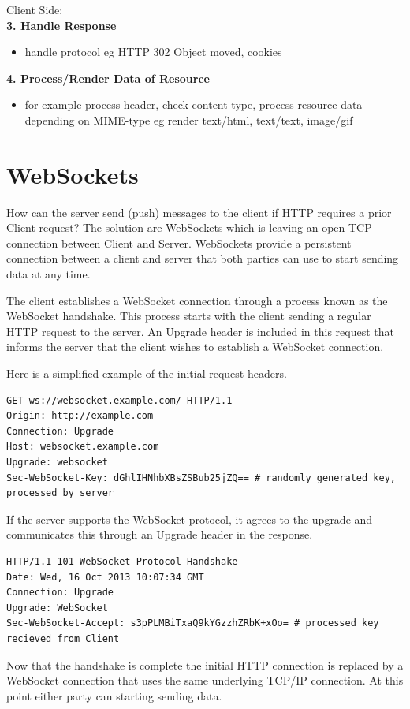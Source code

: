 \documentclass[11pt]{article}
\begin{document}
Client Side:\\
\textbf{3. Handle Response}
\begin{itemize}
\item handle protocol eg HTTP 302 Object moved, cookies
\end{itemize}
\textbf{4. Process/Render Data of Resource}
\begin{itemize}
\item for example process header, check content-type, process resource data depending on MIME-type eg render text/html, text/text, image/gif
\end{itemize}

\section{WebSockets}
\label{sec:orgf5c4e53}
How can the server send (push) messages to the client if HTTP requires a prior Client request? The solution are WebSockets which is leaving an open TCP connection between Client and Server. WebSockets provide a persistent connection between a client and server that both parties can use to start sending data at any time.

The client establishes a WebSocket connection through a process known as the WebSocket handshake. This process starts with the client sending a regular HTTP request to the server. An Upgrade header is included in this request that informs the server that the client wishes to establish a WebSocket connection.

Here is a simplified example of the initial request headers.
\begin{verbatim}
GET ws://websocket.example.com/ HTTP/1.1
Origin: http://example.com
Connection: Upgrade
Host: websocket.example.com
Upgrade: websocket
Sec-WebSocket-Key: dGhlIHNhbXBsZSBub25jZQ== # randomly generated key, processed by server
\end{verbatim}
If the server supports the WebSocket protocol, it agrees to the upgrade and communicates this through an Upgrade header in the response.
\begin{verbatim}
HTTP/1.1 101 WebSocket Protocol Handshake
Date: Wed, 16 Oct 2013 10:07:34 GMT
Connection: Upgrade
Upgrade: WebSocket
Sec-WebSocket-Accept: s3pPLMBiTxaQ9kYGzzhZRbK+xOo= # processed key recieved from Client
\end{verbatim}
Now that the handshake is complete the initial HTTP connection is replaced by a WebSocket connection that uses the same underlying TCP/IP connection. At this point either party can starting sending data.
\end{document}
